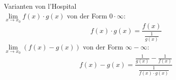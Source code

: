 \begin{definition}{Varianten von l'Hospital}\\
  \(\underset{x\rightarrow x_0}{\lim}f(x)\cdot g(x)\) von der Form \(0\cdot \infty\):
  \[f(x)\cdot g(x)=\frac{f(x)}{\frac{1}{g(x)}}\]
  \(\underset{x\rightarrow x_0}{\lim}(f(x)-g(x))\) von der Form \(\infty - \infty\):
  \[f(x)-g(x)=\frac{\frac{1}{g(x)}-\frac{1}{f(x)}}{\frac{1}{f(x)\cdot g(x)}}\]
\end{definition}









